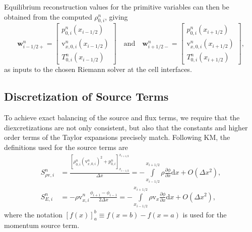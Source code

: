 Equilibrium reconstruction values for the primitive variables can then be obtained from the computed $\rho_{0,i}^n$, giving
\begin{equation} \label{eq:primitives1D1}
\mathbf{w}_{i-1/2+}^n=
\begin{bmatrix}
p_{0,i}^n(x_{i-1/2}) \\ \mathrm{v}_{x,0,i}^n(x_{i-1/2}) \\ T_{0,i}^n(x_{i-1/2})
\end{bmatrix}
\quad \textrm{and} \quad \mathbf{w}_{i+1/2-}^n=
\begin{bmatrix}
p_{0,i}^n(x_{i+1/2}) \\ \mathrm{v}_{x,0,i}^n(x_{i+1/2}) \\ T_{0,i}^n(x_{i+1/2})
\end{bmatrix},
\end{equation}
as inputs to the chosen Riemann solver at the cell interfaces.

\subsection{Discretization of Source Terms}
\label{subsec:sources}

To achieve exact balancing of the source and flux terms, we require that the diexcretizations are not only consistent, but also that the constants and higher order terms of the Taylor expansions precisely match. Following KM, the definitions used for the source terms are
\begin{align}
S_{\rho \mathrm{v},i}^n&=\frac{\left[\rho_{0,i}^n(\mathrm{v}_{x,0,i}^n)^2+p_{0,i}^n\right]_{x_{i-1/2}}^{x_{i+1/2}}}{\Delta x}=-\int\limits_{x_{i-1/2}}^{x_{i+1/2}}\rho \frac{\partial \phi}{\partial x}\textrm{d}x+O\left(\Delta x^2\right), \label{eq:momentumSource} \\
S_{E,i}^n&=-\rho \mathrm{v}_{x,i}^n\frac{\phi_{i+1}-\phi_{i-1}}{2\Delta x}=-\int\limits_{x_{i-1/2}}^{x_{i+1/2}}\rho \mathrm{v}_x \frac{\partial \phi}{\partial x}\textrm{d}x+O\left(\Delta x^2\right), \label{eq:energySource}
\end{align}
where the notation $\left[f(x)\right]_a^b\equiv f(x=b)-f(x=a)$ is used for the momentum source term.

